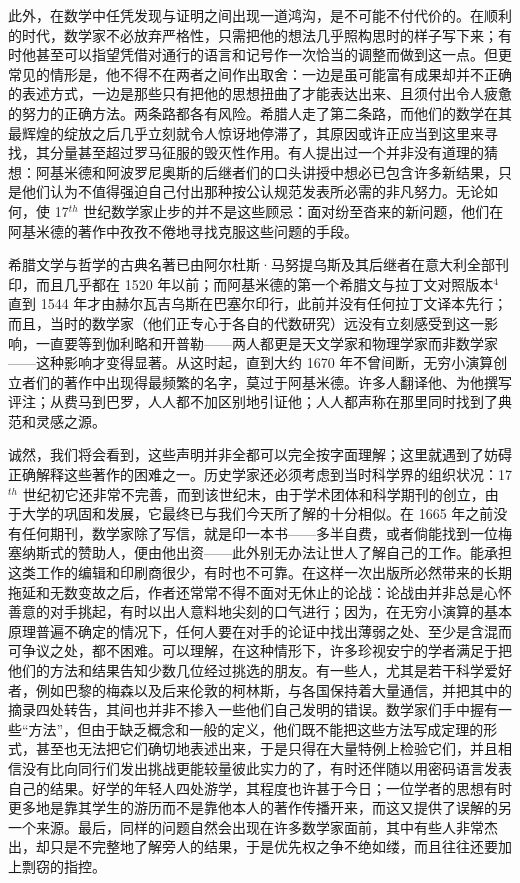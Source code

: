 此外，在数学中任凭发现与证明之间出现一道鸿沟，是不可能不付代价的。在顺利的时代，数学家不必放弃严格性，只需把他的想法几乎照构思时的样子写下来；有时他甚至可以指望凭借对通行的语言和记号作一次恰当的调整而做到这一点。但更常见的情形是，他不得不在两者之间作出取舍：一边是虽可能富有成果却并不正确的表述方式，一边是那些只有把他的思想扭曲了才能表达出来、且须付出令人疲惫的努力的正确方法。两条路都各有风险。希腊人走了第二条路，而他们的数学在其最辉煌的绽放之后几乎立刻就令人惊讶地停滞了，其原因或许正应当到这里来寻找，其分量甚至超过罗马征服的毁灭性作用。有人提出过一个并非没有道理的猜想：阿基米德和阿波罗尼奥斯的后继者们的口头讲授中想必已包含许多新结果，只是他们认为不值得强迫自己付出那种按公认规范发表所必需的非凡努力。无论如何，使 17\(^{th}\) 世纪数学家止步的并不是这些顾忌：面对纷至沓来的新问题，他们在阿基米德的著作中孜孜不倦地寻找克服这些问题的手段。

希腊文学与哲学的古典名著已由阿尔杜斯·马努提乌斯及其后继者在意大利全部刊印，而且几乎都在 1520 年以前；而阿基米德的第一个希腊文与拉丁文对照版本\(^{4}\)直到 1544 年才由赫尔瓦吉乌斯在巴塞尔印行，此前并没有任何拉丁文译本先行；而且，当时的数学家（他们正专心于各自的代数研究）远没有立刻感受到这一影响，一直要等到伽利略和开普勒——两人都更是天文学家和物理学家而非数学家——这种影响才变得显著。从这时起，直到大约 1670 年不曾间断，无穷小演算创立者们的著作中出现得最频繁的名字，莫过于阿基米德。许多人翻译他、为他撰写评注；从费马到巴罗，人人都不加区别地引证他；人人都声称在那里同时找到了典范和灵感之源。

诚然，我们将会看到，这些声明并非全都可以完全按字面理解；这里就遇到了妨碍正确解释这些著作的困难之一。历史学家还必须考虑到当时科学界的组织状况：17\(^{th}\) 世纪初它还非常不完善，而到该世纪末，由于学术团体和科学期刊的创立，由于大学的巩固和发展，它最终已与我们今天所了解的十分相似。在 1665 年之前没有任何期刊，数学家除了写信，就是印一本书——多半自费，或者倘能找到一位梅塞纳斯式的赞助人，便由他出资——此外别无办法让世人了解自己的工作。能承担这类工作的编辑和印刷商很少，有时也不可靠。在这样一次出版所必然带来的长期拖延和无数变故之后，作者还常常不得不面对无休止的论战：论战由并非总是心怀善意的对手挑起，有时以出人意料地尖刻的口气进行；因为，在无穷小演算的基本原理普遍不确定的情况下，任何人要在对手的论证中找出薄弱之处、至少是含混而可争议之处，都不困难。可以理解，在这种情形下，许多珍视安宁的学者满足于把他们的方法和结果告知少数几位经过挑选的朋友。有一些人，尤其是若干科学爱好者，例如巴黎的梅森以及后来伦敦的柯林斯，与各国保持着大量通信，并把其中的摘录四处转告，其间也并非不掺入一些他们自己发明的错误。数学家们手中握有一些“方法”，但由于缺乏概念和一般的定义，他们既不能把这些方法写成定理的形式，甚至也无法把它们确切地表述出来，于是只得在大量特例上检验它们，并且相信没有比向同行们发出挑战更能较量彼此实力的了，有时还伴随以用密码语言发表自己的结果。好学的年轻人四处游学，其程度也许甚于今日；一位学者的思想有时更多地是靠其学生的游历而不是靠他本人的著作传播开来，而这又提供了误解的另一个来源。最后，同样的问题自然会出现在许多数学家面前，其中有些人非常杰出，却只是不完整地了解旁人的结果，于是优先权之争不绝如缕，而且往往还要加上剽窃的指控。

